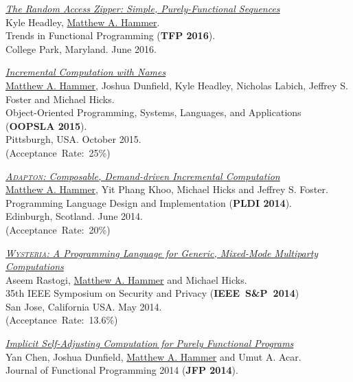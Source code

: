 \documentclass[10pt,letterpaper]{article}
\newcommand{\BeanCounter}[1]{(Acceptance~Rate:~#1\%)}
\renewenvironment{itemize}{
  \begin{list}{}{
    \setlength{\leftmargin}{1.5em}
    \setlength{\itemsep}{0.25em}
    \setlength{\parskip}{0pt}
    \setlength{\parsep}{0.25em}
  }
}{
  \end{list}
}
\begin{document}
\begin{itemize}
\item
\href{https://arxiv.org/abs/1608.06009}{\textit{The Random Access Zipper: Simple, Purely-Functional Sequences}}
\\
Kyle Headley, \underline{Matthew A. Hammer}.
\\
Trends in Functional Programming (\textbf{TFP 2016}).
\\
College Park, Maryland. June 2016. 

\item
\href{http://arxiv.org/abs/1503.07792}
{\textit{Incremental Computation with Names}}
\\
\underline{Matthew A. Hammer}, Joshua Dunfield, Kyle Headley, Nicholas Labich,
Jeffrey S. Foster and Michael Hicks.
\\
Object-Oriented Programming, Systems, Languages, and Applications
(\textbf{OOPSLA 2015}).
\\
Pittsburgh, USA. October 2015.
\\
\BeanCounter{25}

\item
\href{http://www.cs.umd.edu/~hammer/adapton}
{\textit{\textsc{Adapton}: Composable, Demand-driven Incremental Computation}}
\\
\underline{Matthew A. Hammer}, Yit Phang Khoo, Michael Hicks and Jeffrey S. Foster.
\\
Programming Language Design and Implementation (\textbf{PLDI 2014}).
\\
Edinburgh, Scotland. June 2014.
\\
\BeanCounter{20}

\item
\href{http://www.cs.umd.edu/~hammer/oakland2014}
{\textit{\textsc{Wysteria}: A Programming Language for Generic, Mixed-Mode Multiparty Computations}}
\\
Aseem Rastogi, \underline{Matthew A. Hammer} and Michael Hicks.
\\
35th IEEE Symposium on Security and Privacy (\textbf{IEEE~S\&P~2014})
\\
San Jose, California USA. May 2014.
\\
\BeanCounter{13.6}

\item
\href{http://www.cs.umd.edu/~hammer/jfp2014}
{\textit{Implicit Self-Adjusting Computation for Purely Functional Programs}}
\\
Yan Chen, Joshua Dunfield, \underline{Matthew A. Hammer} and Umut A. Acar.
\\
Journal of Functional Programming 2014 (\textbf{JFP 2014}).


\end{itemize}
\end{document}
